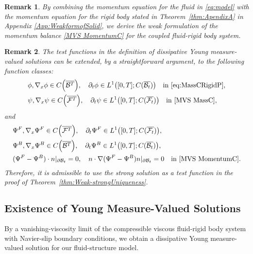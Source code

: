 \documentclass[11pt,twoside,reqno]{amsart}
\numberwithin{equation}{section}
\numberwithin{figure}{section}
\newtheorem{remark}{Remark}[section]
\begin{document}
\begin{remark}
By combining the momentum equation for the fluid in \eqref{eq:model} with the momentum equation for the rigid body stated in Theorem~\ref{thm:ApendixA} in Appendix \ref{App:WeakformofSolid}, we derive the weak formulation of the momentum balance \eqref{MVS MomentumC} for the coupled fluid-rigid body system.
\end{remark}


\begin{remark}
The test functions in the definition of dissipative Young measure-valued solutions can be extended, by a straightforward argument, to the following function classes:
\begin{equation*}
\begin{aligned}
&\phi, \nabla_x \phi \in C\Bigl(\overline{\mathcal{B}^T}\Bigl), \quad
\partial_t \phi \in L^1\bigr([0,T]; C(\overline{\mathcal{B}_t})\bigl) 
\quad \text{in \eqref{eq:MassCRigidP}},\\
&\psi, \nabla_x \psi \in C\Bigl(\overline{\mathcal{F}^T}\Bigr), \quad
\partial_t \psi \in L^1\bigr([0,T]; C(\overline{\mathcal{F}_t})\bigl) 
\quad \text{in \eqref{MVS MassC}},
\end{aligned}
\end{equation*}
and
\begin{equation}
\begin{aligned}
&\Psi^F, \nabla_x \Psi^F \in C\Bigl(\overline{\mathcal{F}^T}\Bigr), \quad
\partial_t \Psi^F \in L^1\bigr([0,T]; C(\overline{\mathcal{F}_t})\bigl),\\
&\Psi^B, \nabla_x \Psi^B \in C\Bigl(\overline{\mathcal{B}^T}\Bigr), \quad
\partial_t \Psi^B \in L^1\bigr([0,T]; C(\overline{\mathcal{B}_t})\bigl),\\
&(\Psi^F - \Psi^B)\cdot n|_{\partial\mathcal{B}_t} = 0, \quad
n \cdot \nabla(\Psi^F - \Psi^B)n|_{\partial\mathcal{B}_t} = 0
\quad \text{in \eqref{MVS MomentumC}}.
\end{aligned}
\end{equation}
Therefore, it is admissible to use the strong solution as a test function in the proof of Theorem~\ref{thm:Weak-strongUniqueness}.
\end{remark}




\subsection{Existence of Young Measure-Valued Solutions}

By a vanishing-viscosity limit of the compressible viscous fluid-rigid body system with Navier-slip boundary conditions, we obtain a dissipative Young measure-valued solution for our fluid-structure model.
\end{document}
